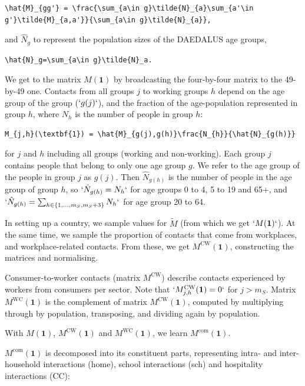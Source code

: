 \documentclass[
]{article}
\begin{document}
\begin{verbatim}
\hat{M}_{gg'} = \frac{\sum_{a\in g}\tilde{N}_{a}\sum_{a'\in g'}\tilde{M}_{a,a'}}{\sum_{a\in g}\tilde{N}_{a}},
\end{verbatim}

and \(\hat{N}_g\) to represent the population sizes of the DAEDALUS age groups,

\begin{verbatim}
\hat{N}_g=\sum_{a\in g}\tilde{N}_a.
\end{verbatim}

We get to the matrix \(M(\textbf{1})\) by broadcasting the four-by-four matrix to the 49-by-49 one. Contacts from all groups \(j\) to working groups \(h\) depend on the age group of the group (\(`g(j)`\)), and the fraction of the age-population represented in group \(h\), where \(N_{h}\) is the number of people in group \(h\):

\begin{verbatim}
M_{j,h}(\textbf{1}) = \hat{M}_{g(j),g(h)}\frac{N_{h}}{\hat{N}_{g(h)}}
\end{verbatim}

for \(j\) and \(h\) including all groups (working and non-working). Each group \(j\) contains people that belong to only one age group \(g\). We refer to the age group of the people in group \(j\) as \(g(j)\). Then \(\hat{N}_{g(h)}\) is the number of people in the age group of group \(h\), so \(`\hat{N}_{g(h)}=N_{h}`\) for age groups 0 to 4, 5 to 19 and 65+, and \(`\hat{N}_{g(h)}=\sum_{h\in\{1,...,m_S,m_S+3\}}N_{h}`\) for age group 20 to 64.

In setting up a country, we sample values for \(\tilde{M}\) (from which we get \(`M(\textbf{1})`\)). At the same time, we sample the proportion of contacts that come from workplaces, and workplace-related contacts. From these, we get \(M^{\text{CW}}(\textbf{1})\), constructing the matrices and normalising.

Consumer-to-worker contacts (matrix \(M^{\text{CW}}\)) describe contacts experienced by workers from consumers per sector. Note that \(`M^{\text{CW}}_{j,h}(\textbf{1})=0`\) for \(j>m_S\). Matrix \(M^{\text{WC}}(\textbf{1})\) is the complement of matrix \(M^{\text{CW}}(\textbf{1})\), computed by multiplying through by population, transposing, and dividing again by population.

With \(M(\textbf{1})\), \(M^{\text{CW}}(\textbf{1})\) and \(M^{\text{WC}}(\textbf{1})\), we learn \(M^{\text{com}}(\textbf{1})\).

\(M^{\text{com}}(\textbf{1})\) is decomposed into its constituent parts, representing intra- and inter-household interactions (home), school interactions (sch) and hospitality interactions (CC):
\end{document}
